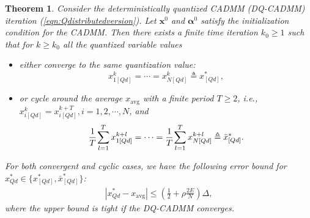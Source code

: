 \documentclass[journal]{IEEEtran}
\newtheorem{theorem}{Theorem}
\begin{document}
\begin{theorem}
\label{thm:mainresults}
Consider the deterministically quantized CADMM (DQ-CADMM) iteration (\ref{eqn:Qdistributedversion}). Let $\bm x^0$ and $\bm\alpha^0$ satisfy the initialization condition for the CADMM. Then there exists a finite time iteration $k_0\geq1$ such that for $k\geq k_0$ all the quantized variable values
\begin{itemize}
\item either converge to the same quantization value:
$$x_{1[Qd]}^k=\cdots=x_{N[Qd]}^k\triangleq x_{[Qd]}^*,$$


\item or cycle around the average $x_\text{avg}$ with a finite period $T\geq2$, i.e., $x_{i[Qd]}^k=x_{i[Qd]}^{k+T}, i=1,2,\cdots, N$, and 
\begin{align}
\label{eqn:cyclic_consensus}
\frac{1}{T}\hspace{-1pt}\sum_{l=1}^{T}x_{1[Qd]}^{k+l}=\cdots =\frac{1}{T}\hspace{-1pt}\sum_{l=1}^{T}x_{N[Qd]}^{k+l}\triangleq\bar{x}_{[Qd]}^{*}.
\end{align}
\end{itemize}

For both convergent and cyclic cases, we have the following error bound for $x^*_{Qd}\in\{x_{[Qd]}^*, \bar{x}_{[Qd]}^*\}$:
\begin{align}
\label{eqn:consensuserror}
\left|x_{Qd}^*-x_\text{avg}\right|\leq \left(\frac{1}{2}+\rho\frac{2E}{N}\right)\Delta,
\end{align}
where the upper bound is tight if the DQ-CADMM converges.



\end{theorem}
\end{document}
